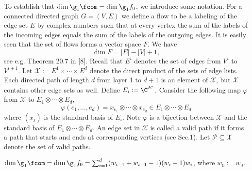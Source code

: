 To establish that $\dim\g_1\fcom=\dim\g_1f_0$, we introduce some notation.
For a connected directed graph $G=(V,E)$ we define a flow to be a labeling of the edge set $E$ by complex numbers such that at every vertex the sum of the labels of the incoming edges equals the sum of the labels of the outgoing edges. It is easily seen that the set of flows forms a vector space $F$. We have
\[\dim F=|E|-|V|+1,\tag{11}\label{eq:flowdim}\]
see e.g. Theorem 20.7 in [8].
Recall that $E^i$ denotes the set of edges from $V^i$ to $V^{i+1}$. Let $\mathcal X:=E^1\times\cdots\times E^d$ denote the direct product of the sets of edge lists. Each directed path of length $d$ from layer 1 to $d+1$ is an element of $\mathcal X$, but $\mathcal X$ contains other edge sets as well. Define $E_i:=\C^{E^i}$. Consider the following map $\varphi$ from $\mathcal X$ to $E_1\otimes\cdots\otimes E_d$,
\[\varphi(e_1,\ldots,e_d)=x_{e_1}\otimes\cdots\otimes x_{e_d}\in E_1\otimes\cdots\otimes E_d\]
where $(x_j)$ is the standard basis of $E_i$. Note $\varphi$ is a bijection between $\mathcal X$ and the standard basis of $E_1\otimes\cdots\otimes E_d$.
An edge set in $\mathcal X$ is called a valid path if it forms a path that starts and ends at corresponding vertices (see Sec.1). Let $\mathcal P\subseteq\mathcal X$ denote the set of valid paths.
\begin{proposition}
$\dim\g_1\fcom=\dim\g_1f_0=\sum_{i=1}^d(w_{i-1}+w_{i+1}-1)(w_i-1)w_i$, where $w_0:=w_d$.
\end{proposition}
